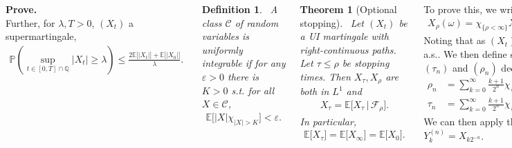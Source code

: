 \documentclass{tikzposter} %
\newtheorem{theorem}{Theorem}
\newtheorem{definition}{Definition}
\begin{document}
\begin{columns}
{    \textbf{Prove.} \\

    Further, for $\lambda, T > 0$, $(X_{t})$ a supermartingale,
    \begin{align*}
      \mathbb{P}\left(\sup_{t \in [0,T] \cap \mathbb{Q}} |X_{t}| \ge \lambda\right) \le \frac{2 \mathbb{E}\big[|X_{t}|\big] + \mathbb{E}\big[|X_{0}|\big]}{\lambda}.
    \end{align*}

    \begin{definition}
    \ A class $\mathcal{C}$ of random variables is uniformly integrable if for any $\varepsilon > 0$ there is $K > 0$ s.t. for all $X \in \mathcal{C}$,
    \begin{align*}
      \mathbb{E}\big[|X|\chi_{|X| > K}\big] < \varepsilon.
    \end{align*}
    \end{definition}
    \hphantom{}

    \begin{theorem}[Optional stopping]
    \ Let $(X_{t})$ be a UI martingale with right-continuous paths. Let $\tau \le \rho$ be stopping times. Then $X_{\tau}, X_{\rho}$ are both in $L^{1}$ and
    \begin{align*}
      X_{\tau} = \mathbb{E}\big[X_{\tau} \,|\, \mathcal{F}_{\rho}\big].
    \end{align*}
    In particular,
    \begin{align*}
      \mathbb{E}\big[X_{\tau}\big] = \mathbb{E}\big[X_{\infty}\big] = \mathbb{E}\big[X_{0}\big].
    \end{align*}
    \end{theorem}

    To prove this, we write
    \begin{align*}
      X_{\rho}(\omega) = \chi_{\{\rho < \infty\}}X_{\rho(\omega)}(\omega) + \chi_{\{\rho = \infty\}} X_{\infty}(\omega).
    \end{align*}
    Noting that as $(X_{t})$ is a UI martingale, $X_{t} \to X_{\infty}$ a.s.. We then define sequences of stopping times $(\tau_{n})$ and $(\rho_{n})$ decreasing to $\tau$ and $\rho$ respectively: \\
    \begin{align*}
      \rho_{n} &= \sum_{k=0}^{\infty} \frac{k+1}{2^{n}} \chi_{\{k2^{-n} < \rho \le (k+1)2^{-n}\}} + \infty \chi_{\{\rho = \infty\}} \\
      \tau_{n} &= \sum_{k=0}^{\infty} \frac{k+1}{2^{n}} \chi_{\{k2^{-n} < \tau \le (k+1)2^{-n}\}} + \infty \chi_{\{\tau = \infty\}}
    \end{align*}
    We can then apply the discrete OST with $Y_{k}^{(n)} = X_{k2^{-n}}$. \\

}
\end{columns}
\end{document}
